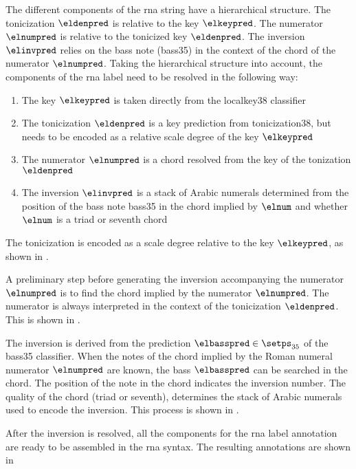 
The different components of the \gls{rna} string have a
hierarchical structure. The tonicization $\eldenpred$ is
relative to the key $\elkeypred$. The numerator $\elnumpred$
is relative to the tonicized key $\eldenpred$. The inversion
$\elinvpred$ relies on the bass note (\gls{bass35}) in the
context of the chord of the numerator $\elnumpred$. Taking
the hierarchical structure into account, the components of
the \gls{rna} label need to be resolved in the following
way:

\begin{enumerate} 
    \item The key $\elkeypred$ is taken directly from the
    \gls{localkey38} classifier 
    \item The tonicization $\eldenpred$ is a key prediction
    from \gls{tonicization38}, but needs to be encoded as a
    relative scale degree of the key $\elkeypred$
    \item The numerator $\elnumpred$ is a chord resolved
    from the key of the tonization $\eldenpred$ 
    \item The inversion $\elinvpred$ is a stack of Arabic
    numerals determined from the position of the bass note
    \gls{bass35} in the chord implied by $\elnum$ and
    whether $\elnum$ is a triad or seventh chord
\end{enumerate}


The tonicization is encoded as a scale degree relative to
the key $\elkeypred$, as shown in
.



A preliminary step before generating the inversion
accompanying the numerator $\elnumpred$ is to find the chord
implied by the numerator $\elnumpred$. The numerator is
always interpreted in the context of the tonicization
$\eldenpred$. This is shown in
.



The inversion is derived from the prediction $\elbasspred
\in \setps_{35}$ of the \gls{bass35} classifier. When the
notes of the chord implied by the Roman numeral numerator
$\elnumpred$ are known, the bass $\elbasspred$ can be
searched in the chord. The position of the note in the chord
indicates the inversion number. The quality of the chord
(triad or seventh), determines the stack of Arabic numerals
used to encode the inversion. This process is shown in
.


After the inversion is resolved, all the components for the
\gls{rna} label annotation are ready to be assembled in the
\gls{rna} syntax. The resulting annotations are shown in
